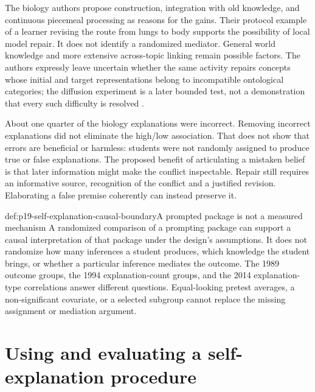 The biology authors propose construction, integration with old knowledge,
and continuous piecemeal processing as reasons for the gains. Their protocol
example of a learner revising the route from lungs to body supports the
possibility of local model repair. It does not identify a randomized
mediator. General world knowledge and more extensive across-topic linking
remain possible factors. The authors expressly leave uncertain whether the
same activity repairs concepts whose initial and target representations
belong to incompatible ontological categories; the diffusion experiment is
a later bounded test, not a demonstration that every such difficulty is
resolved
\cite[pp.~470--475]{ChiEtAl1994Eliciting}
\cite[pp.~847--853]{MuldnerBurlesonChi2014Emergent}.

About one quarter of the biology explanations were incorrect. Removing
incorrect explanations did not eliminate the high/low association. That
does not show that errors are beneficial or harmless: students were not
randomly assigned to produce true or false explanations. The proposed
benefit of articulating a mistaken belief is that later information might
make the conflict inspectable. Repair still requires an informative source,
recognition of the conflict and a justified revision. Elaborating a false
premise coherently can instead preserve it.

\begin{hbwarning}{def:p19-self-explanation-causal-boundary}{A prompted package is not a measured mechanism}
A randomized comparison of a prompting package can support a causal
interpretation of that package under the design's assumptions. It does not
randomize how many inferences a student produces, which knowledge the
student brings, or whether a particular inference mediates the outcome.
The 1989 outcome groups, the 1994 explanation-count groups, and the 2014
explanation-type correlations answer different questions. Equal-looking
pretest averages, a non-significant covariate, or a selected subgroup cannot
replace the missing assignment or mediation argument.
\end{hbwarning}

\section{Using and evaluating a self-explanation procedure}
\label{sec:p19-self-explanation-procedure}


